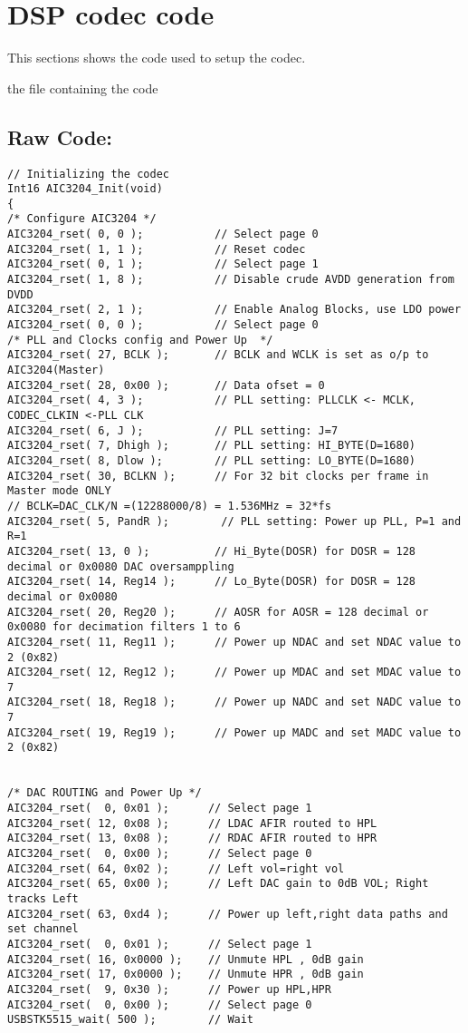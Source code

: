 \section{DSP codec code}\label{sec:codecsetup}

This sections shows the code used to setup the codec.

the file containing the code  

\subsection{Raw Code:}

\begin{lstlisting}
// Initializing the codec
Int16 AIC3204_Init(void)
{	
/* Configure AIC3204 */
AIC3204_rset( 0, 0 );           // Select page 0
AIC3204_rset( 1, 1 );           // Reset codec
AIC3204_rset( 0, 1 );           // Select page 1
AIC3204_rset( 1, 8 );           // Disable crude AVDD generation from DVDD
AIC3204_rset( 2, 1 );           // Enable Analog Blocks, use LDO power
AIC3204_rset( 0, 0 );           // Select page 0
/* PLL and Clocks config and Power Up  */
AIC3204_rset( 27, BCLK );       // BCLK and WCLK is set as o/p to AIC3204(Master)
AIC3204_rset( 28, 0x00 );       // Data ofset = 0
AIC3204_rset( 4, 3 );           // PLL setting: PLLCLK <- MCLK, CODEC_CLKIN <-PLL CLK
AIC3204_rset( 6, J );           // PLL setting: J=7
AIC3204_rset( 7, Dhigh );       // PLL setting: HI_BYTE(D=1680)
AIC3204_rset( 8, Dlow );        // PLL setting: LO_BYTE(D=1680)
AIC3204_rset( 30, BCLKN );      // For 32 bit clocks per frame in Master mode ONLY
// BCLK=DAC_CLK/N =(12288000/8) = 1.536MHz = 32*fs
AIC3204_rset( 5, PandR );        // PLL setting: Power up PLL, P=1 and R=1
AIC3204_rset( 13, 0 );          // Hi_Byte(DOSR) for DOSR = 128 decimal or 0x0080 DAC oversamppling
AIC3204_rset( 14, Reg14 );      // Lo_Byte(DOSR) for DOSR = 128 decimal or 0x0080
AIC3204_rset( 20, Reg20 );      // AOSR for AOSR = 128 decimal or 0x0080 for decimation filters 1 to 6
AIC3204_rset( 11, Reg11 );      // Power up NDAC and set NDAC value to 2 (0x82)
AIC3204_rset( 12, Reg12 );      // Power up MDAC and set MDAC value to 7
AIC3204_rset( 18, Reg18 );      // Power up NADC and set NADC value to 7
AIC3204_rset( 19, Reg19 );      // Power up MADC and set MADC value to 2 (0x82)


/* DAC ROUTING and Power Up */
AIC3204_rset(  0, 0x01 );      // Select page 1
AIC3204_rset( 12, 0x08 );      // LDAC AFIR routed to HPL
AIC3204_rset( 13, 0x08 );      // RDAC AFIR routed to HPR
AIC3204_rset(  0, 0x00 );      // Select page 0
AIC3204_rset( 64, 0x02 );      // Left vol=right vol
AIC3204_rset( 65, 0x00 );      // Left DAC gain to 0dB VOL; Right tracks Left
AIC3204_rset( 63, 0xd4 );      // Power up left,right data paths and set channel
AIC3204_rset(  0, 0x01 );      // Select page 1
AIC3204_rset( 16, 0x0000 );    // Unmute HPL , 0dB gain
AIC3204_rset( 17, 0x0000 );    // Unmute HPR , 0dB gain
AIC3204_rset(  9, 0x30 );      // Power up HPL,HPR
AIC3204_rset(  0, 0x00 );      // Select page 0
USBSTK5515_wait( 500 );        // Wait


\end{lstlisting}
